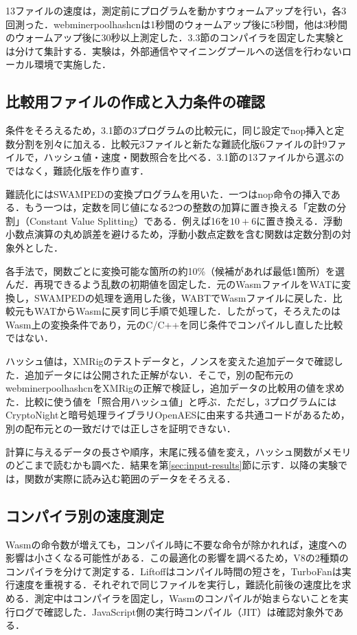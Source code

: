 \documentclass[submit,techrep]{ipsj}
\begin{document}
13ファイルの速度は，測定前にプログラムを動かすウォームアップを行い，各3回測った．webminerpoolhashcnは1秒間のウォームアップ後に5秒間，他は3秒間のウォームアップ後に30秒以上測定した．3.3節のコンパイラを固定した実験とは分けて集計する．実験は，外部通信やマイニングプールへの送信を行わないローカル環境で実施した．

\subsection{比較用ファイルの作成と入力条件の確認}
\label{sec:followup-method}
条件をそろえるため，3.1節の3プログラムの比較元に，同じ設定でnop挿入と定数分割を別々に加える．比較元3ファイルと新たな難読化版6ファイルの計9ファイルで，ハッシュ値・速度・関数照合を比べる．3.1節の13ファイルから選ぶのではなく，難読化版を作り直す．

難読化にはSWAMPEDの変換プログラムを用いた\cite{kim2025}．一つはnop命令の挿入である．もう一つは，定数を同じ値になる2つの整数の加算に置き換える「定数の分割」（Constant Value Splitting）である．例えば16を$10+6$に置き換える．浮動小数点演算の丸め誤差を避けるため，浮動小数点定数を含む関数は定数分割の対象外とした．

各手法で，関数ごとに変換可能な箇所の約10\%（候補があれば最低1箇所）を選んだ．再現できるよう乱数の初期値を固定した．元のWasmファイルをWATに変換し，SWAMPEDの処理を適用した後，WABTでWasmファイルに戻した．比較元もWATからWasmに戻す同じ手順で処理した．したがって，そろえたのはWasm上の変換条件であり，元のC/C++を同じ条件でコンパイルし直した比較ではない．

ハッシュ値は，XMRigのテストデータと，ノンスを変えた追加データで確認した．追加データには公開された正解がない．そこで，別の配布元のwebminerpoolhashcnをXMRigの正解で検証し，追加データの比較用の値を求めた．比較に使う値を「照合用ハッシュ値」と呼ぶ．ただし，3プログラムにはCryptoNightと暗号処理ライブラリOpenAESに由来する共通コードがあるため，別の配布元との一致だけでは正しさを証明できない．

計算に与えるデータの長さや順序，末尾に残る値を変え，ハッシュ関数がメモリのどこまで読むかも調べた．結果を第\ref{sec:input-results}節に示す．以降の実験では，関数が実際に読み込む範囲のデータをそろえる．

\subsection{コンパイラ別の速度測定}
Wasmの命令数が増えても，コンパイル時に不要な命令が除かれれば，速度への影響は小さくなる可能性がある．この最適化の影響を調べるため，V8の2種類のコンパイラを分けて測定する．Liftoffはコンパイル時間の短さを，TurboFanは実行速度を重視する\cite{v8liftoff}．それぞれで同じファイルを実行し，難読化前後の速度比を求める．測定中はコンパイラを固定し，Wasmのコンパイルが始まらないことを実行ログで確認した．JavaScript側の実行時コンパイル（JIT）は確認対象外である．
\end{document}
